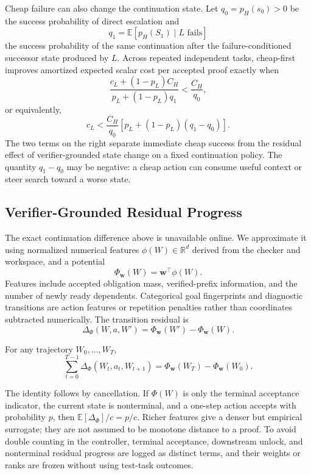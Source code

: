 Cheap failure can also change the continuation state. Let
\(q_0=p_H(s_0)>0\) be the success probability of direct escalation and
\[
  q_1=\mathbb E[p_H(S_1)\mid L\text{ fails}]
\]
the success probability of the same continuation after the
failure-conditioned successor state produced by \(L\). Across repeated
independent tasks, cheap-first improves amortized expected scalar cost per
accepted proof exactly when
\[
  \frac{c_L+(1-p_L)C_H}
       {p_L+(1-p_L)q_1}
  <
  \frac{C_H}{q_0},
\]
or equivalently,
\[
  c_L
  <
  \frac{C_H}{q_0}
  \left[p_L+(1-p_L)(q_1-q_0)\right].
\]
The two terms on the right separate immediate cheap success from the residual
effect of verifier-grounded state change on a fixed continuation policy. The
quantity \(q_1-q_0\) may be negative: a cheap action can consume useful context
or steer search toward a worse state.

\subsection{Verifier-Grounded Residual Progress}

The exact continuation difference above is unavailable online. We approximate
it using normalized numerical features \(\phi(W)\in\mathbb R^d\) derived from
the checker and workspace, and a potential
\[
  \Phi_{\mathbf w}(W)=\mathbf w^\top\phi(W).
\]
Features include accepted obligation mass, verified-prefix information, and
the number of newly ready dependents. Categorical goal fingerprints and
diagnostic transitions are action features or repetition penalties rather than
coordinates subtracted numerically. The transition residual is
\[
  \Delta_\Phi(W,a,W')
  =\Phi_{\mathbf w}(W')-\Phi_{\mathbf w}(W).
\]

\begin{proposition}
For any trajectory \(W_0,\ldots,W_T\),
\[
  \sum_{t=0}^{T-1}\Delta_\Phi(W_t,a_t,W_{t+1})
  =\Phi_{\mathbf w}(W_T)-\Phi_{\mathbf w}(W_0).
\]
\end{proposition}

The identity follows by cancellation. If \(\Phi(W)\) is only the terminal
acceptance indicator, the current state is nonterminal, and a one-step action
accepts with probability \(p\), then
\(\mathbb E[\Delta_\Phi]/c=p/c\). Richer features give a denser but empirical
surrogate; they are not assumed to be monotone distance to a proof. To avoid
double counting in the controller, terminal acceptance, downstream unlock,
and nonterminal residual progress are logged as distinct terms, and their
weights or ranks are frozen without using test-task outcomes.
